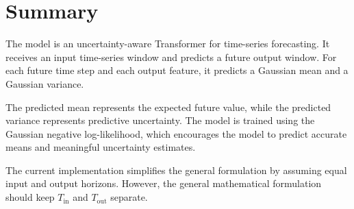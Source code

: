 \documentclass[a4paper]{article}
\begin{document}
    
    \section{Summary}
        
        The model is an uncertainty-aware Transformer for time-series forecasting. It receives an input time-series window and predicts a future output window. For each future time step and each output feature, it predicts a Gaussian mean and a Gaussian variance.
        
        The predicted mean represents the expected future value, while the predicted variance represents predictive uncertainty. The model is trained using the Gaussian negative log-likelihood, which encourages the model to predict accurate means and meaningful uncertainty estimates.
        
        The current implementation simplifies the general formulation by assuming equal input and output horizons. However, the general mathematical formulation should keep \(T_{\mathrm{in}}\) and \(T_{\mathrm{out}}\) separate.
        
        
        
\end{document}
